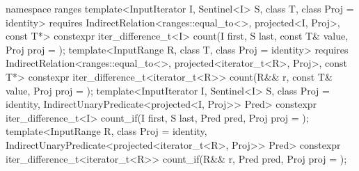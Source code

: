 \begin{codeblock}
{  namespace ranges {
    template<InputIterator I, Sentinel<I> S, class T, class Proj = identity>
      requires IndirectRelation<ranges::equal_to<>, projected<I, Proj>, const T*>
      constexpr iter_difference_t<I>
        count(I first, S last, const T& value, Proj proj = {});
    template<InputRange R, class T, class Proj = identity>
      requires IndirectRelation<ranges::equal_to<>, projected<iterator_t<R>, Proj>, const T*>
      constexpr iter_difference_t<iterator_t<R>>
        count(R&& r, const T& value, Proj proj = {});
    template<InputIterator I, Sentinel<I> S, class Proj = identity,
        IndirectUnaryPredicate<projected<I, Proj>> Pred>
      constexpr iter_difference_t<I>
        count_if(I first, S last, Pred pred, Proj proj = {});
    template<InputRange R, class Proj = identity,
        IndirectUnaryPredicate<projected<iterator_t<R>, Proj>> Pred>
      constexpr iter_difference_t<iterator_t<R>>
        count_if(R&& r, Pred pred, Proj proj = {});
  }

}
\end{codeblock}
